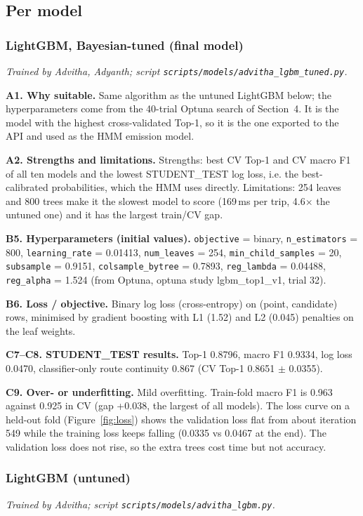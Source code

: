 \documentclass[11pt,a4paper]{article}
\begin{document}
\subsection{Per model}
\subsubsection{LightGBM, Bayesian-tuned (final model)}
\textit{Trained by Advitha, Adyanth; script \texttt{scripts/models/advitha\_lgbm\_tuned.py}.}

\textbf{A1. Why suitable.} Same algorithm as the untuned LightGBM below; the hyperparameters come from the 40-trial Optuna search of Section~4. It is the model with the highest cross-validated Top-1, so it is the one exported to the API and used as the HMM emission model.

\textbf{A2. Strengths and limitations.} Strengths: best CV Top-1 and CV macro F1 of all ten models and the lowest STUDENT\_TEST log loss, i.e. the best-calibrated probabilities, which the HMM uses directly. Limitations: 254 leaves and 800 trees make it the slowest model to score (169\,ms per trip, 4.6$\times$ the untuned one) and it has the largest train/CV gap.

\textbf{B5. Hyperparameters (initial values).} \texttt{objective} = binary, \texttt{n\_estimators} = 800, \texttt{learning\_rate} = 0.01413, \texttt{num\_leaves} = 254, \texttt{min\_child\_samples} = 20, \texttt{subsample} = 0.9151, \texttt{colsample\_bytree} = 0.7893, \texttt{reg\_lambda} = 0.04488, \texttt{reg\_alpha} = 1.524 (from Optuna, optuna study lgbm\_top1\_v1, trial 32).

\textbf{B6. Loss / objective.} Binary log loss (cross-entropy) on (point, candidate) rows, minimised by gradient boosting with L1 (1.52) and L2 (0.045) penalties on the leaf weights.

\textbf{C7--C8. STUDENT\_TEST results.} Top-1 0.8796, macro F1 0.9334, log loss 0.0470, classifier-only route continuity 0.867 (CV Top-1 0.8651 $\pm$ 0.0355).

\textbf{C9. Over- or underfitting.} Mild overfitting. Train-fold macro F1 is 0.963 against 0.925 in CV (gap +0.038, the largest of all models). The loss curve on a held-out fold (Figure~\ref{fig:loss}) shows the validation loss flat from about iteration 549 while the training loss keeps falling (0.0335 vs 0.0467 at the end). The validation loss does not rise, so the extra trees cost time but not accuracy.
\subsubsection{LightGBM (untuned)}
\textit{Trained by Advitha; script \texttt{scripts/models/advitha\_lgbm.py}.}
\end{document}
